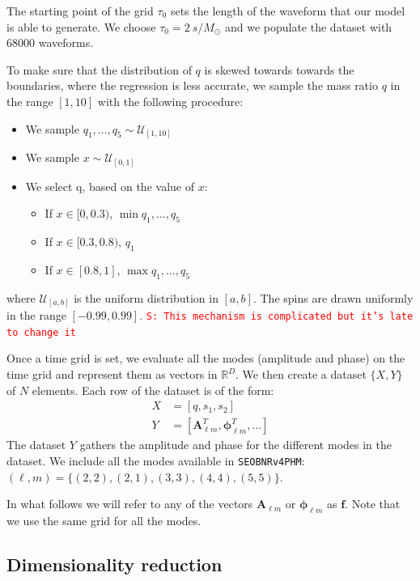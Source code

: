 \documentclass[twocolumn,showpacs,preprintnumbers,nofootinbib,prd,
superscriptaddress,10pt]{revtex4-1}
\newcommand{\R}{\mathbb{R}}
\newcommand{\stefano}[1]{{\textcolor{red}{\texttt{S: #1}} }}
\begin{document}
The starting point of the grid $\tau_0$ sets the length of the waveform that our model is able to generate. We choose $\tau_0 = \SI{2}{s/M_\odot}$ and we populate the dataset with $68000$ waveforms.

To make sure that the distribution of $q$ is skewed towards towards the boundaries, where the regression is less accurate, we sample the mass ratio $q$ in the range $[1,10]$ with the following procedure:
\begin{itemize}
	\item We sample $q_1, \hdots, q_5 \sim \mathcal{U}_{[1,10]}$
	\item We sample $x \sim \mathcal{U}_{[0,1]}$
	\item We select q, based on the value of $x$:
	\begin{itemize}
		\item If $x \in [0,0.3)$, $\min q_1, \hdots, q_5$
		\item If $x \in [0.3, 0.8)$, $q_1$
		\item If $x \in [0.8, 1]$, $\max q_1, \hdots, q_5$
	\end{itemize}
\end{itemize}
where $\mathcal{U}_{[a,b]}$ is the uniform distribution in $[a,b]$.
The spins are drawn uniformly in the range $[-0.99, 0.99]$.
\stefano{This mechanism is complicated but it's late to change it}

Once a time grid is set, we evaluate all the modes (amplitude and phase) on the time grid and represent them as vectors in $\R^D$.
We then create a dataset $\{X, Y\}$ of $N$ elements. Each row of the dataset is of the form:
\begin{align}
	X &= [q, s_1, s_2] \\
	Y &= [\boldsymbol{A}^T_{\ell m}, \boldsymbol{\phi}^T_{\ell m}, \hdots ] 
\end{align}
%
The dataset $Y$ gathers the amplitude and phase for the different modes in the dataset.
We include all the modes available in \texttt{SEOBNRv4PHM}: $(\ell, m) = \{(2,2),(2,1), (3,3), (4,4), (5,5)\}$.

In what follows we will refer to any of the vectors $\boldsymbol{A}_{\ell m}$ or $\boldsymbol{\phi}_{\ell m}$ as $\boldsymbol{f}$.
Note that we use the same grid for all the modes.

\subsection{Dimensionality reduction}
\label{sec:PCA}
\end{document}
